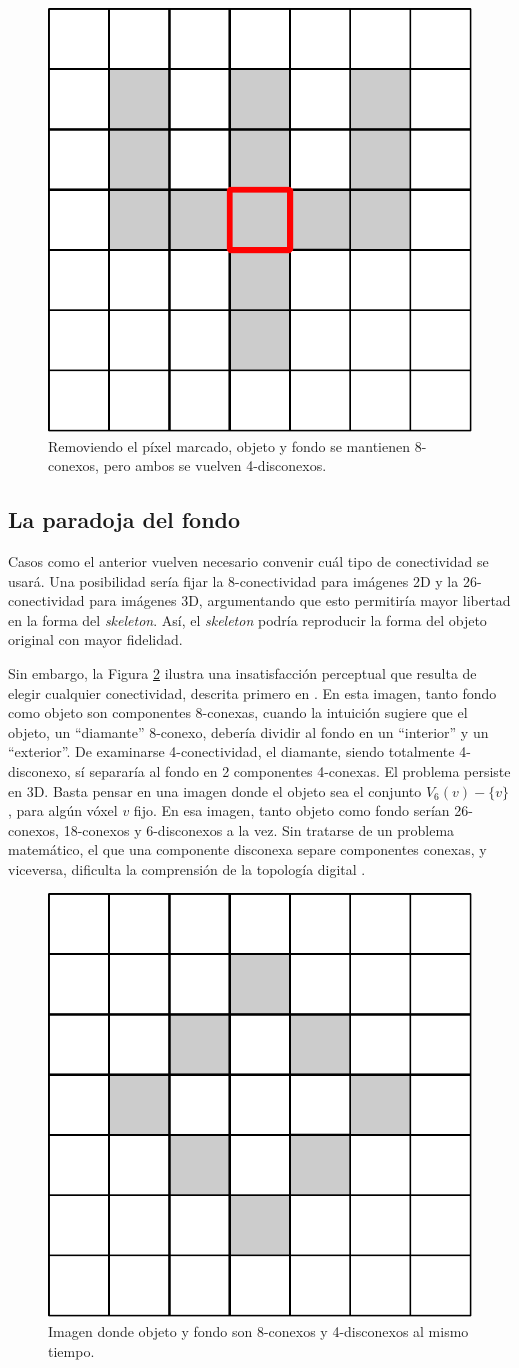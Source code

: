 \begin{figure}[ht]\centering
\includegraphics[width=0.35\linewidth]{images/8connectedcrossv2}
\caption{Removiendo el píxel marcado, objeto y fondo se mantienen 8-conexos, pero ambos se vuelven 4-disconexos.}
\label{fig:8connectedcross}
\end{figure}

\subsection{La paradoja del fondo} \label{ssec:paradox}

Casos como el anterior vuelven necesario convenir cuál tipo de conectividad se usará. Una posibilidad sería fijar la 8-conectividad para imágenes 2D y la 26-conectividad para imágenes 3D, argumentando que esto permitiría mayor libertad en la forma del \textit{skeleton}. Así, el \textit{skeleton} podría reproducir la forma del objeto original con mayor fidelidad.

Sin embargo, la Figura \ref{fig:diamong} ilustra una insatisfacción perceptual que resulta de elegir cualquier conectividad, descrita primero en \cite{duda1967graphical}. En esta imagen, tanto fondo como objeto son componentes 8-conexas, cuando la intuición sugiere que el objeto, un \textquotedblleft diamante\textquotedblright{}  8-conexo, debería dividir al fondo en un ``interior'' y un ``exterior''. De examinarse 4-conectividad, el diamante, siendo totalmente 4-disconexo, sí separaría al fondo en 2 componentes 4-conexas. El problema persiste en 3D. Basta pensar en una imagen donde el objeto sea el conjunto $V_{6}(v) - \{v\}$, para algún vóxel $v$ fijo. En esa imagen, tanto objeto como fondo serían 26-conexos, 18-conexos y 6-disconexos a la vez. Sin tratarse de un problema matemático, el que una componente disconexa separe componentes conexas, y viceversa, dificulta la comprensión de la topología digital \cite{rosenfeld1966sequential}.

\begin{figure}[ht]\centering
\includegraphics[width=0.35\linewidth]{images/diamong}
\caption{Imagen donde objeto y fondo son 8-conexos y 4-disconexos al mismo tiempo.}
\label{fig:diamong}
\end{figure}

